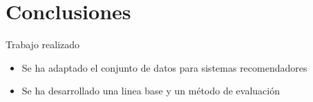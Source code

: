 \section{Conclusiones}
\begin{frame}{Trabajo realizado}
    \begin{itemize}
        \item Se ha adaptado el conjunto de datos para sistemas recomendadores
        \item Se ha desarrollado una linea base y un método de evaluación
    \end{itemize}
\end{frame}